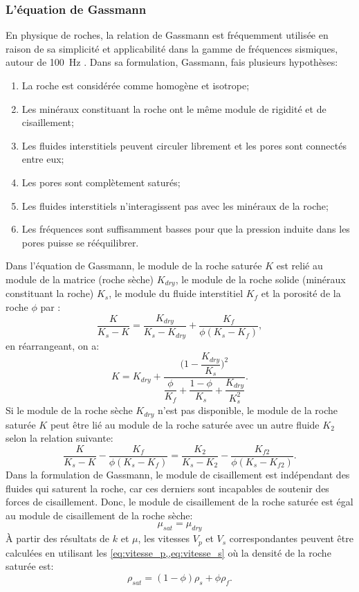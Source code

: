 \subsubsection{L'équation de Gassmann}
En physique de roches, la relation de Gassmann \citep{Gassmann} est fréquemment utilisée en raison de sa simplicité et applicabilité dans la gamme de fréquences sismiques, autour de \SI{100}{\hertz} \citep{Mavko2009}. Dans sa formulation,  Gassmann, fais plusieurs hypothèses:
\begin{enumerate}
\item La roche est considérée comme homogène et isotrope;
\item Les minéraux constituant la roche ont le même module de rigidité et de cisaillement;
\item Les fluides interstitiels peuvent circuler librement et les pores sont connectés entre eux;
\item Les pores sont complètement saturés;
\item Les fluides interstitiels n'interagissent pas avec les minéraux de la roche;
\item Les fréquences sont suffisamment basses pour que la pression induite dans les pores puisse se rééquilibrer.
\end{enumerate} 
Dans l’équation de Gassmann, le module de la roche saturée $K$ est relié au module de la matrice (roche sèche) $K_{dry}$, le module de la roche solide (minéraux constituant la roche) $K_s$, le module du fluide interstitiel $K_f$ et la porosité de la roche $\phi$ par \citep{Mavko2009}:
\begin{equation}
\dfrac{K}{K_s - K} = \dfrac{K_{dry}}{K_s - K_{dry}} + \dfrac{K_f}{\phi (K_s - K_f)},
\end{equation}
en réarrangeant, on a:
\begin{equation}
K = K_{dry} + \dfrac{\bigg(1 - \dfrac{K_{dry}}{K_s}\bigg)^2}{\dfrac{\phi}{K_f}+\dfrac{1-\phi}{K_s} + \dfrac{K_{dry}}{K_s^2}}.
\label{eq:gasmmann}
\end{equation}
Si le module de la roche sèche $K_{dry}$ n'est pas disponible, le module de la roche saturée  $K$ peut être lié au module de la roche saturée avec un autre fluide $K_2$ selon la relation suivante\citep{Mavko2009}:
\begin{equation}
\dfrac{K}{K_s - K} - \dfrac{K_{f}}{\phi(K_s - K_{f})} = \dfrac{K_2}{K_s - K_2} - \dfrac{K_{f2}}{\phi(K_s - K_{f2})}.
\end{equation}
Dans la formulation de Gassmann, le module de cisaillement est indépendant des fluides qui saturent la roche, car ces derniers sont incapables de soutenir des forces de cisaillement. Donc, le module de cisaillement de la roche saturée est égal au module de cisaillement de la roche sèche:
\begin{equation}
\mu_{sat} = \mu_{dry}
\end{equation}
À partir des résultats de $k$ et $\mu$, les vitesses $V_p$ et $V_s$ correspondantes peuvent être calculées en utilisant les \cref{eq:vitesse_p,,eq:vitesse_s} où la densité de la roche saturée est:
\begin{equation}
\rho_{sat} = (1-\phi)\rho_s + \phi \rho_f.
\end{equation}
 
